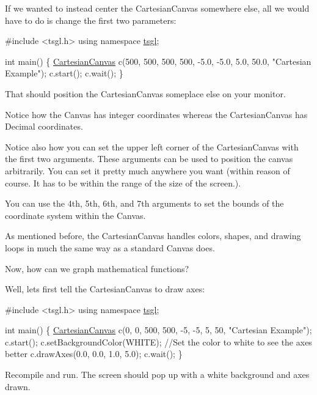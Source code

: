 If we wanted to instead center the Cartesian\+Canvas somewhere else, all we would have to do is change the first two parameters\+:


\begin{DoxyCode}
\textcolor{preprocessor}{#include <tsgl.h>}
\textcolor{keyword}{using namespace }\hyperlink{namespacetsgl}{tsgl};

\textcolor{keywordtype}{int} main() \{
  \hyperlink{classtsgl_1_1_cartesian_canvas}{CartesianCanvas} c(500, 500, 500, 500, -5.0, -5.0, 5.0, 50.0, \textcolor{stringliteral}{"Cartesian Example"});
  c.start();
  c.wait();
\}
\end{DoxyCode}


That should position the Cartesian\+Canvas someplace else on your monitor.

Notice how the Canvas has integer coordinates whereas the Cartesian\+Canvas has Decimal coordinates.

Notice also how you can set the upper left corner of the Cartesian\+Canvas with the first two arguments. These arguments can be used to position the canvas arbitrarily. You can set it pretty much anywhere you want (within reason of course. It has to be within the range of the size of the screen.).

You can use the 4th, 5th, 6th, and 7th arguments to set the bounds of the coordinate system within the Canvas.

As mentioned before, the Cartesian\+Canvas handles colors, shapes, and drawing loops in much the same way as a standard Canvas does.

Now, how can we graph mathematical functions?

Well, let\textquotesingle{}s first tell the Cartesian\+Canvas to draw axes\+:


\begin{DoxyCode}
\textcolor{preprocessor}{#include <tsgl.h>}
\textcolor{keyword}{using namespace }\hyperlink{namespacetsgl}{tsgl};

\textcolor{keywordtype}{int} main() \{
  \hyperlink{classtsgl_1_1_cartesian_canvas}{CartesianCanvas} c(0, 0, 500, 500, -5, -5, 5, 50, \textcolor{stringliteral}{"Cartesian Example"});
  c.start();
  c.setBackgroundColor(WHITE);  \textcolor{comment}{//Set the color to white to see the axes better}
  c.drawAxes(0.0, 0.0, 1.0, 5.0);
  c.wait();
\}
\end{DoxyCode}


Recompile and run. The screen should pop up with a white background and axes drawn.

